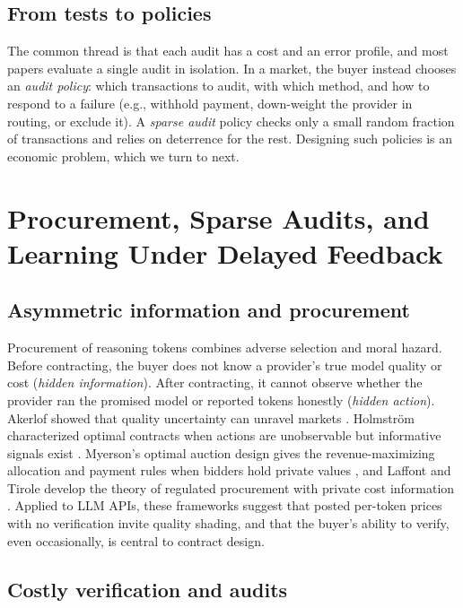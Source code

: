 \subsection{From tests to policies}\label{from-tests-to-policies}

The common thread is that each audit has a cost and an error profile, and most papers evaluate a single audit in isolation. In a market, the buyer instead chooses an \emph{audit policy}: which transactions to audit, with which method, and how to respond to a failure (e.g., withhold payment, down-weight the provider in routing, or exclude it). A \emph{sparse audit} policy checks only a small random fraction of transactions and relies on deterrence for the rest. Designing such policies is an economic problem, which we turn to next.

\section{Procurement, Sparse Audits, and Learning Under Delayed Feedback}\label{procurement-sparse-audits-and-learning-under-delayed-feedback}

\subsection{Asymmetric information and procurement}\label{asymmetric-information-and-procurement}

Procurement of reasoning tokens combines adverse selection and moral hazard. Before contracting, the buyer does not know a provider's true model quality or cost (\emph{hidden information}). After contracting, it cannot observe whether the provider ran the promised model or reported tokens honestly (\emph{hidden action}). Akerlof showed that quality uncertainty can unravel markets \cite{akerlof1970lemons}. Holmström characterized optimal contracts when actions are unobservable but informative signals exist \cite{holmstrom1979moral}. Myerson's optimal auction design gives the revenue-maximizing allocation and payment rules when bidders hold private values \cite{myerson1981optimal}, and Laffont and Tirole develop the theory of regulated procurement with private cost information \cite{laffont1993procurement}. Applied to LLM APIs, these frameworks suggest that posted per-token prices with no verification invite quality shading, and that the buyer's ability to verify, even occasionally, is central to contract design.

\subsection{Costly verification and audits}\label{costly-verification-and-audits}

